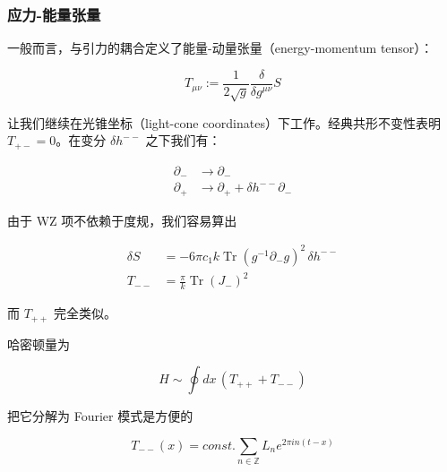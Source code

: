 \subsubsection{应力-能量张量} %

一般而言，与引力的耦合定义了能量-动量张量（energy-momentum tensor）：

\begin{equation}
  T_{\mu\nu}:=\frac{1}{2\sqrt{g}}\frac{\delta}{\delta g^{\mu\nu}}S
  \tag{4.74}
  \label{eq:4.74}
\end{equation}


让我们继续在光锥坐标（light-cone coordinates）下工作。经典共形不变性表明 $T_{+-}=0$。在变分 $\delta h^{--}$ 之下我们有：

\begin{equation}
  \begin{aligned}
    \partial_- &\to \partial_-\\
    \partial_+ &\to \partial_+ + \delta h^{--}\partial_-
  \end{aligned}
  \tag{4.75}
  \label{eq:4.75}
\end{equation}

由于 WZ 项不依赖于度规，我们容易算出

\begin{equation}
  \begin{aligned}
    \delta S &= -6\pi c_1 k\operatorname{Tr}(g^{-1}\partial_- g)^2\,\delta h^{--}\\
    T_{--} &= \frac{\pi}{k}\operatorname{Tr}(J_-)^2
  \end{aligned}
  \tag{4.76}
  \label{eq:4.76}
\end{equation}

而 $T_{++}$ 完全类似。

哈密顿量为

\begin{equation}
  H\sim\oint dx\,(T_{++}+T_{--})
  \tag{4.77}
  \label{eq:4.77}
\end{equation}

把它分解为 Fourier 模式是方便的

\begin{equation}
  T_{--}(x)=\mathit{const.}\sum_{n\in\mathbb{Z}}L_n e^{2\pi i n(t-x)}
  \tag{4.78}
  \label{eq:4.78}
\end{equation}

